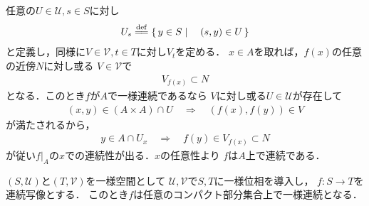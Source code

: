 	\begin{prf}
		任意の$U \in \mathscr{U},s \in S$に対し
		\begin{align}
			U_s \defeq \Set{y \in S}{(s,y) \in U}
		\end{align}
		と定義し，同様に$V \in \mathscr{V},t \in T$に対し$V_t$を定める．
		$x \in A$を取れば，$f(x)$の任意の近傍$N$に対し或る
		$V \in \mathscr{V}$で
		\begin{align}
			V_{f(x)} \subset N
		\end{align}
		となる．このとき$f$が$A$で一様連続であるなら
		$V$に対し或る$U \in \mathscr{U}$が存在して
		\begin{align}
			(x,y) \in (A \times A) \cap U 
			\quad \Longrightarrow \quad (f(x),f(y)) \in V
		\end{align}
		が満たされるから，
		\begin{align}
			y \in A \cap U_x \quad \Longrightarrow \quad
			f(y) \in V_{f(x)} \subset N
		\end{align}
		が従い$\left. f\right|_A$の$x$での連続性が出る．$x$の任意性より
		$f$は$A$上で連続である．
		\QED
	\end{prf}
	
	\begin{screen}
		\begin{thm}[連続写像はコンパクト集合上で一様連続]
			$(S,\mathscr{U})$と$(T,\mathscr{V})$を一様空間として
			$\mathscr{U},\mathscr{V}$で$S,T$に一様位相を導入し，
			$f:S \longrightarrow T$を連続写像とする．
			このとき$f$は任意のコンパクト部分集合上で一様連続となる．
		\end{thm}
	\end{screen}
	
